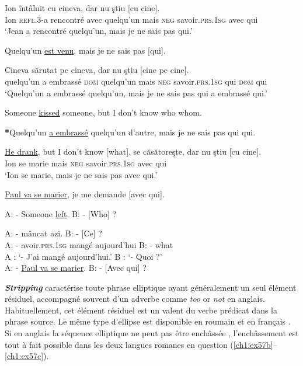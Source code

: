 \ea
\gll Ion   întâlnit cu  cineva,  dar  nu  ştiu  [cu  cine]. \label{ch1:ex49}\\
  Ion  \textsc{refl.3-}a  rencontré  avec  quelqu’un  mais  \textsc{neg}  savoir.\textsc{prs.1sg}  avec  qui  \\
\glt ‘Jean a rencontré quelqu’un, mais je ne sais pas qui.’ 
\z

\largerpage[2]
\ea 
Quelqu’un \uline{est venu}, mais je ne sais pas [qui]. \label{ch1:ex50}
\z

\ea \label{ch1:ex51}
\ea
\gll   Cineva   sărutat  pe  cineva,  dar  nu  ştiu  [cine  pe  cine]. \label{ch1:ex51a}\\
quelqu’un  a  embrassé  \textsc{dom}  quelqu’un  mais  \textsc{neg}  savoir.\textsc{prs.1sg}  qui  \textsc{dom}  qui\\
\glt ‘Quelqu’un a embrassé quelqu’un, mais je ne sais pas qui a embrassé qui.’ 

\newpage 
\ex  *Someone \uline{kissed} someone, but I don’t know who whom. \label{ch1:ex51b}

\ex  \textbf{*}Quelqu’un \uline{a embrassé} quelqu’un d’autre, mais je ne sais pas qui qui. \label{ch1:ex51c}
\z
\z

\ea \label{ch1:ex52}
\ea  \uline{He drank}, but I don’t know [what]. 
\ex
\gll  {} se căsătoreşte,  dar  nu  ştiu  [cu  cine].\\
    Ion  se  marie  mais  \textsc{neg}  savoir.\textsc{prs.1sg}  avec  qui\\
\glt ‘Ion se marie, mais je ne sais pas avec qui.’ 

\ex  \uline{Paul va se marier}, je me demande [avec qui]. 
\z
\z

\ea \label{ch1:ex53}
\ea  A: - Someone \uline{left}. B: - [Who] ?

\ex
\gll   A: -  mâncat  azi. B: -  [Ce] ?\\
    A: - avoir.\textsc{prs.1sg}  mangé  aujourd’hui B: - what\\
\glt    A : ‘- J’ai mangé aujourd’hui.’ B : ‘- Quoi ?’\\

\ex  A: - \uline{Paul va se marier}. B: - [Avec qui] ?
\z
\z

\textbf{\textit{Stripping}} \citep{Ross1969,HankamerEtAl1976} caractérise toute phrase elliptique ayant généralement un seul élément résiduel, accompagné souvent d’un adverbe comme \textit{too}  or \textit{not}  en anglais. Habituellement, cet élément résiduel est un valent du verbe prédicat dans la phrase source. Le même type d’ellipse est disponible en roumain  et en français . Si en anglais la sé\-quence elliptique ne peut pas être enchâssée , l’enchâssement est tout à fait possible dans les deux langues romanes en question (\ref{ch1:ex57b}--\ref{ch1:ex57c}). 

